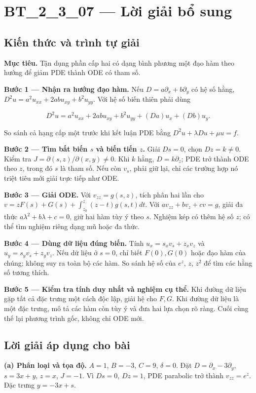 \documentclass[10pt,a4paper]{article}
\begin{document}
\section*{BT\_2\_3\_07 — Lời giải bổ sung}
\subsection*{Kiến thức và trình tự giải}
\textbf{Mục tiêu.} Tận dụng phần cấp hai có dạng bình phương một đạo hàm theo hướng để giảm PDE thành ODE có tham số.

\textbf{Bước 1 — Nhận ra hướng đạo hàm.} Nếu $D=a\partial_x+b\partial_y$ có hệ số hằng, $D^2u=a^2u_{xx}+2ab u_{xy}+b^2u_{yy}$. Với hệ số biến thiên phải dùng


\[
D^2u=a^2u_{xx}+2ab u_{xy}+b^2u_{yy}+(Da)u_x+(Db)u_y.
\]


So sánh cả hạng cấp một trước khi kết luận PDE bằng $D^2u+\lambda Du+\mu u=f$.

\textbf{Bước 2 — Tìm bất biến $s$ và biến tiến $z$.} Giải $Ds=0$, chọn $Dz=k\ne0$. Kiểm tra $J=\partial(s,z)/\partial(x,y)\ne0$. Khi $k$ hằng, $D=k\partial_z$; PDE trở thành ODE theo $z$, trong đó $s$ là tham số. Nếu còn $v_s$, phải giữ lại, chỉ các trường hợp nó triệt tiêu mới giải trực tiếp như ODE.

\textbf{Bước 3 — Giải ODE.} Với $v_{zz}=g(s,z)$, tích phân hai lần cho $v=zF(s)+G(s)+\int_{z_0}^z(z-t)g(s,t)dt$. Với $a v_{zz}+b v_z+c v=g$, giải đa thức $a\lambda^2+b\lambda+c=0$, giữ hai hàm tùy ý theo $s$. Nghiệm kép có thêm hệ số $z$; có thể tìm nghiệm riêng dạng mũ hoặc đa thức.

\textbf{Bước 4 — Dùng dữ liệu đúng biến.} Tính $u_x=s_xv_s+z_xv_z$ và $u_y=s_yv_s+z_yv_z$. Nếu dữ liệu ở $s=0$, chỉ biết $F(0),G(0)$ hoặc đạo hàm của chúng; không suy ra toàn bộ các hàm. So sánh hệ số của $e^z$, $z$, $z^2$ để tìm các hằng số tương thích.

\textbf{Bước 5 — Kiểm tra tính duy nhất và nghiệm cụ thể.} Khi đường dữ liệu gặp tất cả đặc trưng một cách độc lập, giải hệ cho $F,G$. Khi đường dữ liệu là một đặc trưng, mô tả các hàm còn tùy ý và đưa hai lựa chọn rõ ràng. Cuối cùng thế lại phương trình gốc, không chỉ ODE mới.
\subsection*{Lời giải áp dụng cho bài}
\textbf{(a) Phân loại và tọa độ.} $A=1$, $B=-3$, $C=9$, $\delta=0$. Đặt $D=\partial_x-3\partial_y$, $s=3x+y$, $z=x$, $J=-1$. Vì $Ds=0$, $Dz=1$, PDE parabolic trở thành $v_{zz}=e^z$. Đặc trưng $y=-3x+s$.
\end{document}
